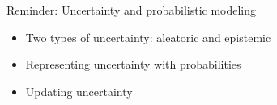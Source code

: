 \documentclass[english,t]{beamer}
\begin{document}


\begin{frame}{Reminder: Uncertainty and probabilistic modeling}

  \begin{itemize}
  \item Two types of uncertainty: aleatoric and epistemic
    \vspace{\baselineskip}
  \item Representing uncertainty with probabilities
    \vspace{\baselineskip}
  \item Updating uncertainty
    \vspace{\baselineskip}
   \end{itemize}
\end{frame}
\end{document}
